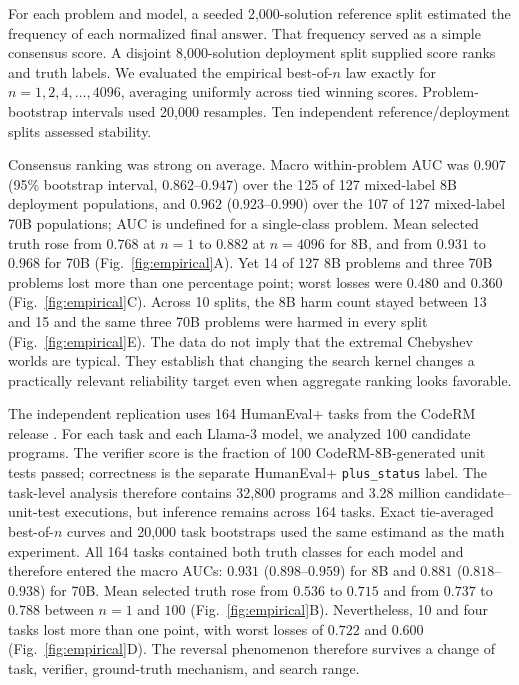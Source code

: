 \documentclass[10pt,twocolumn]{article}
\begin{document}
For each problem and model, a seeded 2,000-solution reference split estimated the frequency of each normalized final answer. That frequency served as a simple consensus score. A disjoint 8,000-solution deployment split supplied score ranks and truth labels. We evaluated the empirical best-of-$n$ law exactly for $n=1,2,4,\ldots,4096$, averaging uniformly across tied winning scores. Problem-bootstrap intervals used 20,000 resamples. Ten independent reference/deployment splits assessed stability.

Consensus ranking was strong on average. Macro within-problem AUC was $0.907$ (95\% bootstrap interval, $0.862$--$0.947$) over the 125 of 127 mixed-label 8B deployment populations, and $0.962$ ($0.923$--$0.990$) over the 107 of 127 mixed-label 70B populations; AUC is undefined for a single-class problem. Mean selected truth rose from $0.768$ at $n=1$ to $0.882$ at $n=4096$ for 8B, and from $0.931$ to $0.968$ for 70B (Fig.~\ref{fig:empirical}A). Yet 14 of 127 8B problems and three 70B problems lost more than one percentage point; worst losses were $0.480$ and $0.360$ (Fig.~\ref{fig:empirical}C). Across 10 splits, the 8B harm count stayed between 13 and 15 and the same three 70B problems were harmed in every split (Fig.~\ref{fig:empirical}E). The data do not imply that the extremal Chebyshev worlds are typical. They establish that changing the search kernel changes a practically relevant reliability target even when aggregate ranking looks favorable.

The independent replication uses 164 HumanEval+ tasks from the CodeRM release \citep{ma2025}. For each task and each Llama-3 model, we analyzed 100 candidate programs. The verifier score is the fraction of 100 CodeRM-8B-generated unit tests passed; correctness is the separate HumanEval+ \texttt{plus\_status} label. The task-level analysis therefore contains 32,800 programs and 3.28 million candidate--unit-test executions, but inference remains across 164 tasks. Exact tie-averaged best-of-$n$ curves and 20,000 task bootstraps used the same estimand as the math experiment. All 164 tasks contained both truth classes for each model and therefore entered the macro AUCs: $0.931$ ($0.898$--$0.959$) for 8B and $0.881$ ($0.818$--$0.938$) for 70B. Mean selected truth rose from $0.536$ to $0.715$ and from $0.737$ to $0.788$ between $n=1$ and $100$ (Fig.~\ref{fig:empirical}B). Nevertheless, 10 and four tasks lost more than one point, with worst losses of $0.722$ and $0.600$ (Fig.~\ref{fig:empirical}D). The reversal phenomenon therefore survives a change of task, verifier, ground-truth mechanism, and search range.
\end{document}
